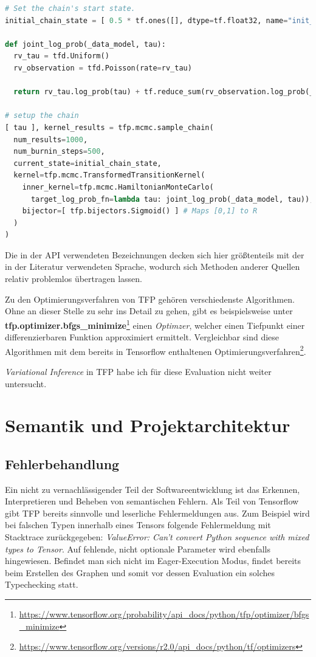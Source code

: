 \documentclass[12pt]{article}
\begin{document}
\begin{lstlisting}[language=Python, caption={Verwendung des Hamiltonian Monte Carlo Algorithmus (gekürzt)}, label={lst:mcmc}]
# Set the chain's start state.
initial_chain_state = [ 0.5 * tf.ones([], dtype=tf.float32, name="init_tau") ]

def joint_log_prob(_data_model, tau):
  rv_tau = tfd.Uniform()
  rv_observation = tfd.Poisson(rate=rv_tau)

  return rv_tau.log_prob(tau) + tf.reduce_sum(rv_observation.log_prob(_data_model))

# setup the chain
[ tau ], kernel_results = tfp.mcmc.sample_chain(
  num_results=1000,
  num_burnin_steps=500,
  current_state=initial_chain_state,
  kernel=tfp.mcmc.TransformedTransitionKernel(
    inner_kernel=tfp.mcmc.HamiltonianMonteCarlo(
      target_log_prob_fn=lambda tau: joint_log_prob(_data_model, tau)),
    bijector=[ tfp.bijectors.Sigmoid() ] # Maps [0,1] to R  
  )
)
\end{lstlisting}

Die in der API verwendeten Bezeichnungen decken sich hier größtenteils mit der in der Literatur verwendeten Sprache, wodurch sich Methoden anderer Quellen relativ problemlos übertragen lassen. 

Zu den Optimierungsverfahren von TFP gehören verschiedenste Algorithmen. Ohne an dieser Stelle zu sehr ins Detail zu gehen, gibt es beispielsweise unter \textbf{tfp.optimizer.bfgs\_minimize}\footnote{\url{https://www.tensorflow.org/probability/api_docs/python/tfp/optimizer/bfgs_minimize}} einen \textit{Optimzer}\cite{Nocedal2006}, welcher einen Tiefpunkt einer differenzierbaren Funktion approximiert ermittelt. Vergleichbar sind diese Algorithmen mit dem bereits in Tensorflow enthaltenen Optimierungsverfahren\footnote{\url{https://www.tensorflow.org/versions/r2.0/api_docs/python/tf/optimizers}}.

\textit{Variational Inference} in TFP habe ich für diese Evaluation nicht weiter untersucht.

\section{Semantik und Projektarchitektur}

\subsection{Fehlerbehandlung}
Ein nicht zu vernachlässigender Teil der Softwareentwicklung ist das Erkennen, Interpretieren und Beheben von semantischen Fehlern. Als Teil von Tensorflow gibt TFP bereits sinnvolle und leserliche Fehlermeldungen aus. Zum Beispiel wird bei falschen Typen innerhalb eines Tensors folgende Fehlermeldung mit Stacktrace zurückgegeben: \textit{ValueError: Can't convert Python sequence with mixed types to Tensor}. Auf fehlende, nicht optionale Parameter wird ebenfalls hingewiesen. Befindet man sich nicht im Eager-Execution Modus, findet bereits beim Erstellen des Graphen und somit vor dessen Evaluation ein solches Typechecking statt. 
\end{document}
